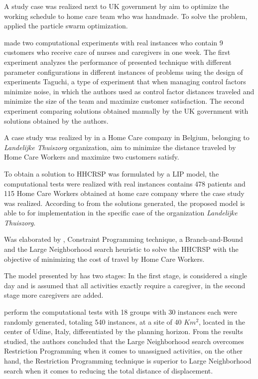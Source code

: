 A study case was realized next to UK government by  aim to optimize the working schedule to home care team who was handmade. To solve the problem, applied the particle swarm optimization.

 made two computational experiments with real instances who contain 9 customers who receive care of nurses and caregivers in one week.
The first experiment analyzes the performance of presented technique with different parameter configurations in different instances of problems using the design of experiments Taguchi, a type of experiment that when managing control factors minimize noise, in which the authors used as control factor distances traveled and minimize the size of the team and maximize customer satisfaction.
The second experiment comparing solutions obtained manually by the UK government with solutions obtained by the authors.

A case study was realized by  in a Home Care company in Belgium, belonging to \textit{Landelijke Thuiszorg} organization, aim to minimize the distance traveled by Home Care Workers and maximize two customers satisfy.

To obtain a solution to \ac{HHCRSP} was formulated by  a \ac{LIP} model, the computational tests were realized with real instances contains 478 patients and 115 Home Care Workers obtained at home care company where the case study was realized.
According to  from the solutions generated, the proposed model is able to for implementation in the specific case of the organization \textit{Landelijke Thuiszorg}.

Was elaborated by , Constraint Programming technique, a Branch-and-Bound and the Large Neighborhood search heuristic to solve the HHCRSP with the objective of minimizing the cost of travel by Home Care Workers.

The model presented by  has two stages: In the first stage, is considered a single day and is assumed that all activities exactly require a caregiver, in the second stage more caregivers are added.

 perform the computational tests with 18 groups with 30 instances each were randomly generated, totaling 540 instances, at a site of 40 $Km^{2}$, located in the center of Udine, Italy, differentiated by the planning horizon. 
From the results studied, the authors concluded that the Large Neighborhood search overcomes Restriction Programming when it comes to unassigned activities, on the other hand, the Restriction Programming technique is superior to Large Neighborhood search when it comes to reducing the total distance of displacement.